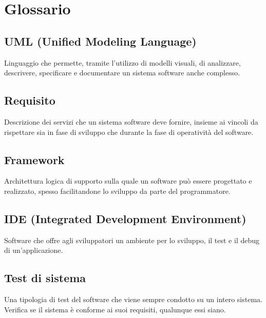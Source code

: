 \cleardoublepage
\chapter{Glossario}

\nocite{*}

\section*{UML (Unified Modeling Language)}
\label{sec:uml-definition}
Linguaggio che permette, tramite l'utilizzo di modelli visuali, di analizzare, descrivere, specificare e documentare un sistema software anche complesso.

\section*{Requisito}
\label{sec:requisito-definition}
Descrizione dei servizi che un sistema software deve fornire, insieme ai vincoli da rispettare sia in fase di sviluppo che durante la fase di operatività del software.

\section*{Framework}
\label{sec:framework-definition}
Architettura logica di supporto sulla quale un software può essere progettato e realizzato, spesso facilitandone lo sviluppo da parte del programmatore.

\section*{IDE (Integrated Development Environment)}
\label{sec:ide-definition}
Software che offre agli sviluppatori un ambiente per lo sviluppo, il test e il debug di un'applicazione.

\section*{Test di sistema}
\label{sec:test-definition}
Una tipologia di test del software che viene sempre condotto su un intero sistema. Verifica se il sistema è conforme ai suoi requisiti, qualunque essi siano.